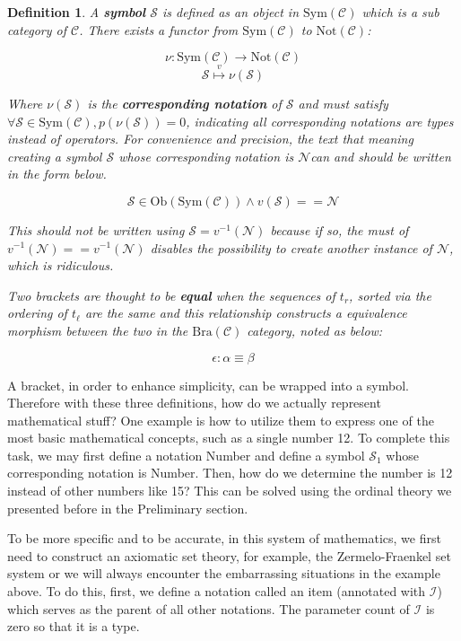 \documentclass{article}
\newtheorem{definition}{Definition}
\begin{document}
\begin{definition}
	A \textbf{ symbol} \(\mathcal{S}\) is defined as an object in \(\text{Sym}(\mathcal{C})\) which is a sub category of \(\mathcal{C}\). There exists a functor from \(\text{Sym}(\mathcal{C})\) to \(\text{Not}(\mathcal{C})\):
	
	\[\nu :\text{Sym}(\mathcal{C})\to \text{Not}(\mathcal{C})\]
	\[\mathcal{S}\overset{\mathit{v}}{\mapsto }\nu (\mathcal{S})\]
	
	Where \(\nu (\mathcal{S})\) is the \textbf{ corresponding notation} of \(\mathcal{S}\) and must satisfy \(\forall \mathcal{S}\in \text{Sym}(\mathcal{C}),\mathit{p}(\nu (\mathcal{S}))=0\), indicating all corresponding notations are types instead of operators. For convenience and precision, the text that meaning creating a symbol \(\mathcal{S}\) whose corresponding notation is \(\mathcal{N}\)can and should be written in the form below.
	
	\[\mathcal{S}\in \text{Ob}(\text{Sym}(\mathcal{C}))\land \mathit{v}(\mathcal{S})==\mathcal{N}\]
	
	This should not be written using \(\mathcal{S}=\mathit{v}^{-1}(\mathcal{N})\) because if so, the must of \(\mathit{v}^{-1}(\mathcal{N})==\mathit{v}^{-1}(\mathcal{N})\) disables the possibility to create another instance of \(\mathcal{N}\), which is ridiculous. 
	
	Two brackets are thought to be \textbf{ equal} when the sequences of \(t_{\mathit{r}}\), sorted via the ordering of \(t_{\ell }\) are the same and this relationship constructs a equivalence morphism between the two in the \(\text{Bra}(\mathcal{C})\) category, noted as below:
	
	\[\epsilon :\alpha \equiv \beta\]
\end{definition}

A bracket, in order to enhance simplicity, can be wrapped into a symbol. Therefore with these three definitions, how do we actually represent mathematical stuff? One example is how to utilize them to express one of the most basic mathematical concepts, such as a single number 12. To complete this task, we may first define a notation Number and define a symbol \(\mathcal{S}_1\) whose corresponding notation is Number. Then, how do we determine the number is 12 instead of other numbers like 15? This can be solved using the ordinal theory we presented before in the Preliminary section.

To be more specific and to be accurate, in this system of mathematics, we first need to construct an axiomatic set theory, for example, the Zermelo-Fraenkel set system or we will always encounter the embarrassing situations in the example above. To do this, first, we define a notation called an item (annotated with \(\mathcal{I}\)) which serves as the parent of all other notations. The parameter count of \(\mathcal{I}\) is zero so that it is a type.
\end{document}
